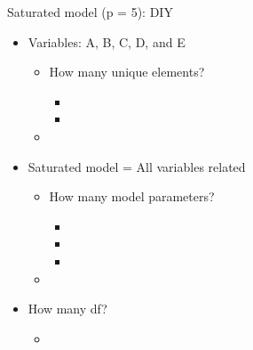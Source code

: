 \documentclass[10pt]{beamer}\usepackage[]{graphicx}\usepackage[]{xcolor}
\begin{document}
\begin{frame}[fragile]{Saturated model (p = 5): DIY}

\begin{itemize}
\item{Variables: A, B, C, D, and E}  
  \begin{itemize}
  \item{How many unique elements?}
  \begin{itemize}
    \item{}
    \item{}
  \end{itemize}
  \item 
\end{itemize}
\vspace{5mm}
\item{Saturated model = All variables related}
  \begin{itemize}
  \item{How many model parameters?}
  \begin{itemize}
    \item{}
    \item{}
    \item{}
  \end{itemize}
  \item 
\end{itemize}
\vspace{5mm}
\item{How many df?}
  \begin{itemize}
    \item{}
  \end{itemize}
\end{itemize}
\end{frame}
%
\end{document}
